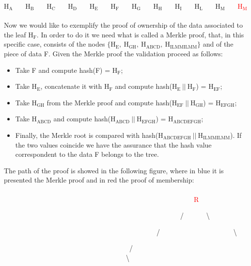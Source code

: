 H$_\text{A}$ \ \ \ H$_\text{B}$ \ \ \ H$_\text{C}$ \ \ \ H$_\text{D}$ \ \ \ H$_\text{E}$ \ \ \ H$_\text{F}$ \ \ \ H$_\text{G}$ \ \ \ H$_\text{H}$ \ \ \ H$_\text{I}$ \ \ \ H$_\text{L}$ \ \ \ H$_\text{M}$ \ \ \ \textcolor{red}{H$_\text{M}$}
\\
\\
Now we would like to exemplify the proof of ownership of the data associated to the leaf H$_\text{F}$. In order to do it we need what is called a Merkle proof, that, in this specific case, consists of the nodes  $\{\text{H}_\text{E}, \ \text{H}_\text{GH}, \ \text{H}_\text{ABCD}, \ \text{H}_\text{ILMMILMM}\}$ and of the piece of data F. Given the Merkle proof the validation proceed as follows:
\begin{itemize}
	\item Take F and compute hash(F) = H$_\text{F}$;
	\item Take H$_\text{E}$, concatenate it with H$_\text{F}$ and compute hash(H$_\text{E} \ || \ \text{H}_\text{F}$) = H$_\text{EF}$;
	\item Take H$_\text{GH}$ from the Merkle proof and compute hash(H$_\text{EF} \ || \ \text{H}_\text{GH}$) = H$_\text{EFGH}$; 
	\item Take H$_\text{ABCD}$ and compute hash($\text{H}_\text{ABCD} \ || \ \text{H}_\text{EFGH}$) = H$_\text{ABCDEFGH}$;
	\item Finally, the Merkle root is compared with hash(H$_\text{ABCDEFGH} \ || \ \text{H}_\text{ILMMILMM}$). If the two values coincide we have the assurance that the hash value correspondent to the data F belongs to the tree.
\end{itemize}
The path of the proof is showed in the following figure, where in blue it is presented the Merkle proof and in red the proof of membership:
\\
\\

\ \ \ \ \ \ \ \ \ \ \ \ \ \ \ \ \ \ \ \ \ \ \ \ \ \ \ \ \ \ \ \ \ \ \ \ \ \ \ \ \ \ \ \ \ \ \ \ \ \ \ \ \ \ \ \ \textcolor{red}{R}

\ \ \ \ \ \ \ \ \ \ \ \ \ \ \ \ \ \ \ \ \ \ \ \ \ \ \ \ \ \ \ \ \ \ \ \ \ \ \ \ \ \ \ \ \ \ \ \ \ \ \ \ / \ \ \ \ \ \ \textbackslash

\ \ \ \ \ \ \ \ \ \ \ \ \ \ \ \ \ \ \ \ \ \ \ \ \ \ \ \ \ \ \ \ \ \ \ \ \ \ \ \ \ \ \ \ \ /  \ \ \ \ \ \ \ \ \ \ \ \ \ \ \ \ \ \ \ \ \ \textbackslash

\ \ \ \ \ \ \ \ \ \ \ \ \ \ \ \ \ \ \ \ \ \ \ \ \ \ \ \ \ \ \ \ \ \ \ \ \ / \ \ \ \ \ \ \ \ \ \ \ \ \ \ \ \ \ \ \ \ \ \ \ \ \ \ \ \ \ \ \ \ \ \ \ \ \textbackslash

